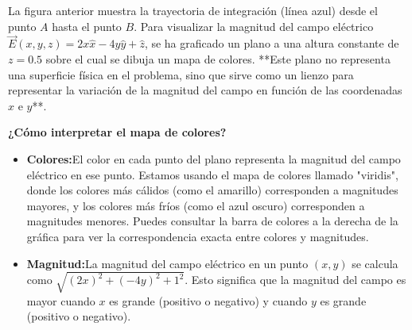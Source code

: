 \documentclass{article}
\begin{document}
\begin{center}

\end{center}

La figura anterior muestra la trayectoria de integración (línea azul) desde el punto $A$ hasta el punto $B$. Para visualizar la magnitud del campo eléctrico $\vec{E}(x, y, z) = 2x\hat{x} - 4y\hat{y} + \hat{z}$, se ha graficado un plano a una altura constante de $z=0.5$ sobre el cual se dibuja un mapa de colores.  **Este plano no representa una superficie física en el problema, sino que sirve como un lienzo para representar la variación de la magnitud del campo en función de las coordenadas $x$ e $y$**.

\textbf{¿Cómo interpretar el mapa de colores?}
\begin{itemize}
    \item \textbf{Colores:}El color en cada punto del plano representa la magnitud del campo eléctrico en ese punto. Estamos usando el mapa de colores llamado "viridis", donde los colores más cálidos (como el amarillo) corresponden a magnitudes mayores, y los colores más fríos (como el azul oscuro) corresponden a magnitudes menores. Puedes consultar la barra de colores a la derecha de la gráfica para ver la correspondencia exacta entre colores y magnitudes.
    \item \textbf{Magnitud:}La magnitud del campo eléctrico en un punto $(x, y)$ se calcula como $\sqrt{(2x)^2 + (-4y)^2 + 1^2}$.  Esto significa que la magnitud del campo es mayor cuando $x$ es grande (positivo o negativo) y cuando $y$ es grande (positivo o negativo).
\end{itemize}
\end{document}

